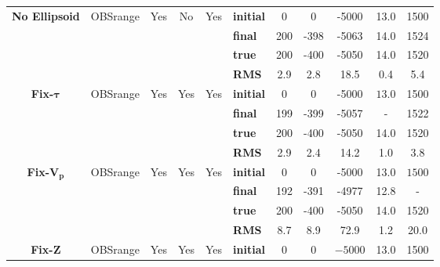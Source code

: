 \begin{table}
{\begin{tabular}{c | c c c c | l c c c c c}
\hline
\multirow{4}{*}{\textbf{No Ellipsoid}} & \multirow{4}{*}{OBSrange} & \multirow{4}{*}{Yes} & \multirow{4}{*}{No} & \multirow{4}{*}{Yes}  & \textbf{initial} & 0 & 0 & -5000 & 13.0 & 1500 \\ 
\multirow{4}{*}{} & \multirow{4}{*}{} & \multirow{4}{*}{} & \multirow{4}{*}{} & \multirow{4}{*}{} & \textbf{final}& 200 & -398 & -5063 & 14.0 & 1524 \\ 
\multirow{4}{*}{} & \multirow{4}{*}{} & \multirow{4}{*}{} & \multirow{4}{*}{} & \multirow{4}{*}{} & \textbf{true}& 200 & -400 & -5050 & 14.0 & 1520 \\ 
\multirow{4}{*}{} & \multirow{4}{*}{} & \multirow{4}{*}{} & \multirow{4}{*}{} & \multirow{4}{*}{} & \textbf{RMS} & 2.9 & 2.8 & 18.5 & 0.4 & 5.4 \\ 
\hline
\multirow{4}{*}{\textbf{Fix-$\boldsymbol{\tau}$}} & \multirow{4}{*}{OBSrange} & \multirow{4}{*}{Yes} & \multirow{4}{*}{Yes} & \multirow{4}{*}{Yes}  & \textbf{initial} & 0 & 0 & -5000 & $\mathit{13.0}$ & 1500 \\ 
\multirow{4}{*}{} & \multirow{4}{*}{} & \multirow{4}{*}{} & \multirow{4}{*}{} & \multirow{4}{*}{} & \textbf{final}& 199 & -399 & -5057 & - & 1522 \\ 
\multirow{4}{*}{} & \multirow{4}{*}{} & \multirow{4}{*}{} & \multirow{4}{*}{} & \multirow{4}{*}{} & \textbf{true}& 200 & -400 & -5050 & 14.0 & 1520 \\ 
\multirow{4}{*}{} & \multirow{4}{*}{} & \multirow{4}{*}{} & \multirow{4}{*}{} & \multirow{4}{*}{} & \textbf{RMS} & 2.9 & 2.4 & 14.2 & 1.0 & 3.8 \\ 
\hline
\multirow{4}{*}{\textbf{Fix-$\mathbf{V_p}$}} & \multirow{4}{*}{OBSrange} & \multirow{4}{*}{Yes} & \multirow{4}{*}{Yes} & \multirow{4}{*}{Yes}  & \textbf{initial} & 0 & 0 & -5000 & 13.0 & $\mathit{1500}$ \\ 
\multirow{4}{*}{} & \multirow{4}{*}{} & \multirow{4}{*}{} & \multirow{4}{*}{} & \multirow{4}{*}{} & \textbf{final}& 192 & -391 & -4977 & 12.8 & - \\ 
\multirow{4}{*}{} & \multirow{4}{*}{} & \multirow{4}{*}{} & \multirow{4}{*}{} & \multirow{4}{*}{} & \textbf{true}& 200 & -400 & -5050 & 14.0 & 1520 \\ 
\multirow{4}{*}{} & \multirow{4}{*}{} & \multirow{4}{*}{} & \multirow{4}{*}{} & \multirow{4}{*}{} & \textbf{RMS} & 8.7 & 8.9 & 72.9 & 1.2 & 20.0 \\ 
\hline
\multirow{4}{*}{\textbf{Fix-Z}} & \multirow{4}{*}{OBSrange} & \multirow{4}{*}{Yes} & \multirow{4}{*}{Yes} & \multirow{4}{*}{Yes}  & \textbf{initial} & 0 & 0 & $\mathit{-5000}$ & 13.0 & 1500 \\ 

\end{tabular}}
\end{table}
